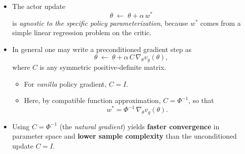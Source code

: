 \begin{itemize}
  \item The actor update 
  \[
    \theta \;\gets\;\theta + \alpha\,w^*
  \]
  is \emph{agnostic to the specific policy parameterization}, because \(w^*\) comes from a simple linear regression problem on the critic.

  \item In general one may write a preconditioned gradient step as
  \[
    \theta \;\gets\;\theta + \alpha\,C\,\nabla_\theta v_g(\theta),
  \]
  where \(C\) is any symmetric positive‐definite matrix.  
  \begin{itemize}
    \item For \emph{vanilla} policy gradient, \(C = I\).  
    \item Here, by compatible function approximation, \(C = \Phi^{-1}\), so that 
    \[
      w^* = \Phi^{-1}\,\nabla_\theta v_g(\theta).
    \]
  \end{itemize}

  \item Using \(C=\Phi^{-1}\) (the \emph{natural gradient}) yields \textbf{faster convergence} in parameter space and \textbf{lower sample complexity} than the unconditioned update \(C=I\).
\end{itemize}

